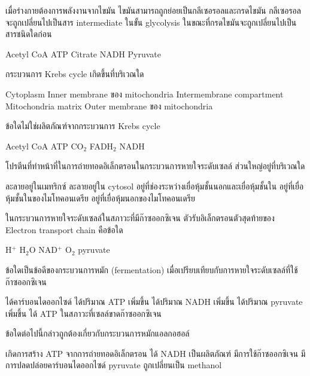 \documentclass[12pt, a4paper]{exam}
\begin{document}
\begin{questions}
\filbreak
  \question เมื่อร่างกายต้องการพลังงานจากไขมัน ไขมันสามารถถูกย่อยเป็นกลีเซอรอลและกรดไขมัน กลีเซอรอลจะถูกเปลี่ยนไปเป็นสาร intermediate ในขั้น glycolysis ในขณะที่กรดไขมันจะถูกเปลี่ยนไปเป็นสารชนิดใดก่อน
  \begin{choices}
    \choice Acetyl CoA
    \choice ATP
    \choice Citrate
    \choice NADH
    \choice Pyruvate
\end{choices}

\filbreak
  \question กระบวนการ Krebs cycle เกิดขึ้นที่บริเวณใด
  \begin{choices}
    \choice Cytoplasm
    \choice Inner membrane ของ mitochondria
    \choice Intermembrane compartment
    \choice Mitochondria matrix
    \choice Outer membrane ของ mitochondria
\end{choices}

\filbreak
  \question ข้อใดไม่ใช่ผลิตภัณฑ์จากกระบวนการ Krebs cycle
  \begin{choices}
    \choice Acetyl CoA
    \choice ATP
    \choice CO$_2$
    \choice FADH$_2$
    \choice NADH
\end{choices}

\filbreak
  \question โปรตีนที่ทำหน้าที่ในการถ่ายทอดอิเล็กตรอนในกระบวนการหายใจระดับเซลล์ ส่วนใหญ่อยู่ที่บริเวณใด
  \begin{choices}
    \choice ละลายอยู่ในเมทริกซ์
    \choice ละลายอยู่ใน cytosol
    \choice อยู่ที่ช่องระหว่างเยื่อหุ้มชั้นนอกและเยื่อหุ้มชั้นใน
    \choice อยู่ที่เยื่อหุ้มชั้นในของไมโทคอนเดรีย
    \choice อยู่ที่เยื่อหุ้มนอกของไมโทคอนเดรีย
\end{choices}

\filbreak
  \question ในกระบวนการหายใจระดับเซลล์ในสภาวะที่มีก๊าซออกซิเจน ตัวรับอิเล็กตรอนตัวสุดท้ายของ Electron transport chain คือข้อใด
  \begin{choices}
    \choice H$^+$
    \choice H$_2$O
    \choice NAD$^+$
    \choice O$_2$
    \choice pyruvate
\end{choices}

\filbreak
  \question ข้อใดเป็นข้อดีของกระบวนการหมัก (fermentation) เมื่อเปรียบเทียบกับการหายใจระดับเซลล์ที่ใช้ก๊าซออกซิเจน
  \begin{choices}
    \choice ได้คาร์บอนไดออกไซด์
    \choice ได้ปริมาณ ATP เพิ่มขึ้น
    \choice ได้ปริมาณ NADH เพิ่มขึ้น
    \choice ได้ปริมาณ pyruvate เพิ่มขึ้น
    \choice ได้ ATP ในสภาวะที่เซลล์ขาดก๊าซออกซิเจน
\end{choices}

\filbreak
  \question ข้อใดต่อไปนี้กล่าวถูกต้องเกี่ยวกับกระบวนการหมักแอลกอฮอล์
  \begin{choices}
    \choice เกิดการสร้าง ATP จากการถ่ายทอดอิเล็กตรอน
    \choice ได้ NADH เป็นผลิตภัณฑ์
    \choice มีการใช้ก๊าซออกซิเจน
    \choice มีการปลดปล่อยคาร์บอนไดออกไซด์
    \choice pyruvate ถูกเปลี่ยนเป็น methanol
\end{choices}

\end{questions}
\end{document}
